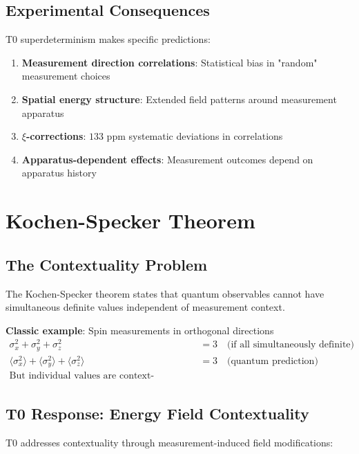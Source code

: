 \documentclass[12pt,a4paper]{article}
\newcommand{\xipar}{\xi}
\begin{document}
	\subsection{Experimental Consequences}
	
	T0 superdeterminism makes specific predictions:
	
	\begin{enumerate}
		\item \textbf{Measurement direction correlations}: Statistical bias in "random" measurement choices
		\item \textbf{Spatial energy structure}: Extended field patterns around measurement apparatus
		\item \textbf{$\xipar$-corrections}: $133$ ppm systematic deviations in correlations
		\item \textbf{Apparatus-dependent effects}: Measurement outcomes depend on apparatus history
	\end{enumerate}
	
	\section{Kochen-Specker Theorem}
	
	\subsection{The Contextuality Problem}
	
	The Kochen-Specker theorem states that quantum observables cannot have simultaneous definite values independent of measurement context.
	
	\textbf{Classic example}: Spin measurements in orthogonal directions
	\begin{align}
		\sigma_x^2 + \sigma_y^2 + \sigma_z^2 &= 3 \quad \text{(if all simultaneously definite)} \\
		\langle\sigma_x^2\rangle + \langle\sigma_y^2\rangle + \langle\sigma_z^2\rangle &= 3 \quad \text{(quantum prediction)} \\
		\text{But individual values are context-dependent!}
	\end{align}
	
	\subsection{T0 Response: Energy Field Contextuality}
	
	T0 addresses contextuality through measurement-induced field modifications:
	
\end{document}
